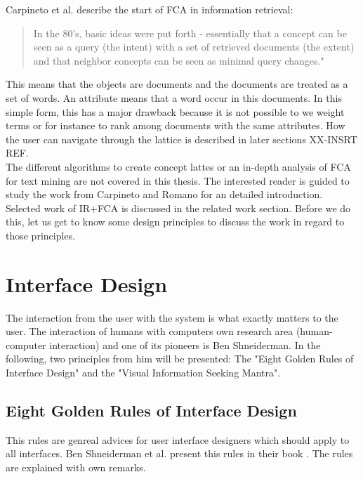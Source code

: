 \documentclass[11pt]{report}
\begin{document}
Carpineto et al.\cite{Carpineto2005} describe the start of FCA in information retrieval:

\begin{quote}
In the 80's, basic ideas were put forth - essentially that a concept can be seen as a query (the intent) with a set of retrieved documents (the extent) and that neighbor concepts can be seen as minimal query changes."
\end{quote}

This means that the objects are documents and the documents are treated as a set of words. An attribute means that a word occur in this documents. In this simple form, this has a major drawback because it is not possible to we weight terms or for instance to rank among documents with the same attributes. How the user can navigate through the lattice is described in later sections XX-INSRT REF.\\

The different algorithms to create concept lattes or an in-depth analysis of FCA for text mining are not covered in this thesis. The interested reader is guided to study the work from Carpineto and Romano \cite{carpineto2004concept} for an detailed introduction. \\

Selected work of IR+FCA is discussed in the related work section. Before we do this, let us get to know some design principles to discuss the work in regard to those principles.

\section{Interface Design}

The interaction from the user with the system is what exactly matters to the user. The interaction of humans with computers own research area (human-computer interaction) and one of its pioneers is Ben Shneiderman. In the following, two principles from him will be presented: The "Eight Golden Rules of Interface Design" and the "Visual Information Seeking Mantra".

\subsection{Eight Golden Rules of Interface Design}

This rules are genreal advices for user interface designers which should apply to all interfaces. Ben Shneiderman et al. present this rules in their book \cite{Shneiderman2010}. The rules are explained with own remarks. \\
\end{document}
